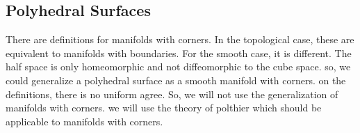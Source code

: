 \documentclass{stdlocal}
\begin{document}




\subsection{Polyhedral Surfaces} %
\label{sub:polyhedral_surfaces}

  There are definitions for manifolds with corners.
  In the topological case, these are equivalent to manifolds with boundaries.
  For the smooth case, it is different.
  The half space is only homeomorphic and not diffeomorphic to the cube space.
  so, we could generalize a polyhedral surface as a smooth manifold with corners.
  on the definitions, there is no uniform agree.
  So, we will not use the generalization of manifolds with corners.
  we will use the theory of polthier which should be applicable to manifolds with corners.
\end{document}
